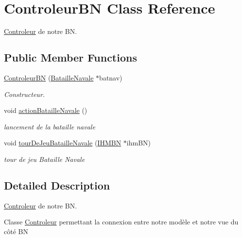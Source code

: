 \hypertarget{classControleurBN}{\section{Controleur\-B\-N Class Reference}
\label{classControleurBN}
}


\hyperlink{classControleur}{Controleur} de notre B\-N.  


\subsection*{Public Member Functions}
\begin{DoxyCompactItemize}
\item 
\hyperlink{classControleurBN_ac135f946e0783bc8afd63bb6b1ba0ed6}{Controleur\-B\-N} (\hyperlink{classBatailleNavale}{Bataille\-Navale} $\ast$batnav)
\begin{DoxyCompactList}\small\item\em Constructeur. \end{DoxyCompactList}\item 
void \hyperlink{classControleurBN_a459747029d8787d21c2063c718771c97}{action\-Bataille\-Navale} ()
\begin{DoxyCompactList}\small\item\em lancement de la bataille navale \end{DoxyCompactList}\item 
void \hyperlink{classControleurBN_a41ac895ee55442bf38ed4997298c4503}{tour\-De\-Jeu\-Bataille\-Navale} (\hyperlink{classIHMBN}{I\-H\-M\-B\-N} $\ast$ihm\-B\-N)
\begin{DoxyCompactList}\small\item\em tour de jeu Bataille Navale \end{DoxyCompactList}\end{DoxyCompactItemize}


\subsection{Detailed Description}
\hyperlink{classControleur}{Controleur} de notre B\-N. 

Classe \hyperlink{classControleur}{Controleur} permettant la connexion entre notre modèle et notre vue du côté B\-N 

